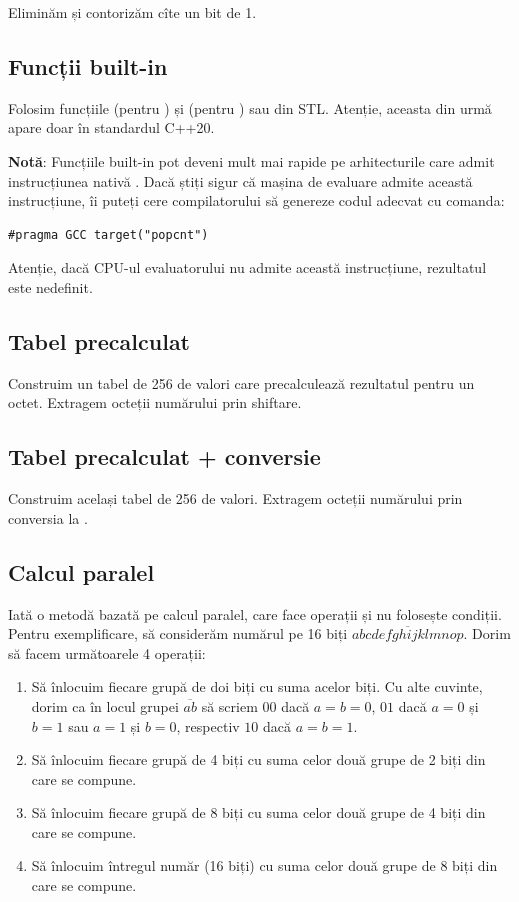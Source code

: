 \documentclass[../main.tex]{subfiles}
\begin{document}
Eliminăm și contorizăm cîte un bit de 1.

\subsection{Funcții built-in}

Folosim funcțiile  (pentru ) și  (pentru ) sau  din STL. Atenție, aceasta din urmă apare doar în standardul C++20.

\textbf{Notă}: Funcțiile built-in pot deveni mult mai rapide pe arhitecturile care admit instrucțiunea nativă . Dacă știți sigur că mașina de evaluare admite această instrucțiune, îi puteți cere compilatorului să genereze codul adecvat cu comanda:

\begin{verbatim}
#pragma GCC target("popcnt")
\end{verbatim}

Atenție, dacă CPU-ul evaluatorului nu admite această instrucțiune, rezultatul este nedefinit.

\subsection{Tabel precalculat}

Construim un tabel de 256 de valori care precalculează rezultatul pentru un octet. Extragem octeții numărului prin shiftare.

\subsection{Tabel precalculat + conversie}

Construim același tabel de 256 de valori. Extragem octeții numărului prin conversia la .

\subsection{Calcul paralel}

Iată o metodă bazată pe calcul paralel, care face  operații și nu folosește condiții. Pentru exemplificare, să considerăm numărul pe 16 biți $\overline{abcdefghijklmnop}$. Dorim să facem următoarele 4 operații:

\begin{enumerate}
  \item Să înlocuim fiecare grupă de doi biți cu suma acelor biți. Cu alte cuvinte, dorim ca în locul grupei $\overline{ab}$ să scriem $00$ dacă $a=b=0$, $01$ dacă $a=0$ și $b=1$ sau $a=1$ și $b=0$, respectiv $10$ dacă $a=b=1$.
  \item Să înlocuim fiecare grupă de 4 biți cu suma celor două grupe de 2 biți din care se compune.
  \item Să înlocuim fiecare grupă de 8 biți cu suma celor două grupe de 4 biți din care se compune.
  \item Să înlocuim întregul număr (16 biți) cu suma celor două grupe de 8 biți din care se compune.
\end{enumerate}
\end{document}
